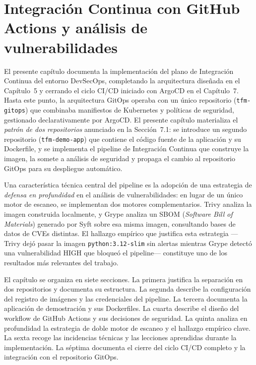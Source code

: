 \chapter{Integración Continua con GitHub Actions y análisis de vulnerabilidades}

El presente capítulo documenta la implementación del plano de Integración Continua del entorno DevSecOps, completando la arquitectura diseñada en el Capítulo~5 y cerrando el ciclo CI/CD iniciado con ArgoCD en el Capítulo~7. Hasta este punto, la arquitectura GitOps operaba con un único repositorio (\texttt{tfm-gitops}) que combinaba manifiestos de Kubernetes y políticas de seguridad, gestionado declarativamente por ArgoCD. El presente capítulo materializa el \textit{patrón de dos repositorios} anunciado en la Sección~7.1: se introduce un segundo repositorio (\texttt{tfm-demo-app}) que contiene el código fuente de la aplicación y su Dockerfile, y se implementa el pipeline de Integración Continua que construye la imagen, la somete a análisis de seguridad y propaga el cambio al repositorio GitOps para su despliegue automático.

Una característica técnica central del pipeline es la adopción de una estrategia de \textit{defensa en profundidad} en el análisis de vulnerabilidades: en lugar de un único motor de escaneo, se implementan dos motores complementarios. Trivy \cite{trivy_docs} analiza la imagen construida localmente, y Grype \cite{grype_docs} analiza un SBOM (\textit{Software Bill of Materials}) \cite{syft_docs} generado por Syft sobre esa misma imagen, consultando bases de datos de CVEs distintas. El hallazgo empírico que justifica esta estrategia ---Trivy dejó pasar la imagen \texttt{python:3.12-slim} sin alertas mientras Grype detectó una vulnerabilidad HIGH que bloqueó el pipeline--- constituye uno de los resultados más relevantes del trabajo.

El capítulo se organiza en siete secciones. La primera justifica la separación en dos repositorios y documenta su estructura. La segunda describe la configuración del registro de imágenes y las credenciales del pipeline. La tercera documenta la aplicación de demostración y sus Dockerfiles. La cuarta describe el diseño del workflow de GitHub Actions y sus decisiones de seguridad. La quinta analiza en profundidad la estrategia de doble motor de escaneo y el hallazgo empírico clave. La sexta recoge las incidencias técnicas y las lecciones aprendidas durante la implementación. La séptima documenta el cierre del ciclo CI/CD completo y la integración con el repositorio GitOps.

